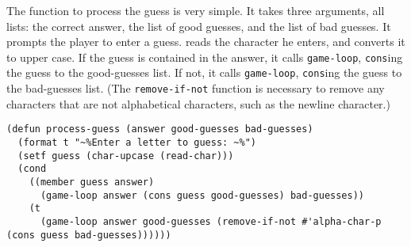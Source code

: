 \documentclass{article}
\begin{document}
The function to process the guess is very simple. It takes three arguments, all lists: the correct answer, the list of good guesses, and the list of bad guesses. It prompts the player to enter a guess. reads the character he enters, and converts it to upper case. If the guess is contained in the answer, it calls \texttt{game-loop}, \texttt{cons}ing the guess to the good-guesses list. If not, it calls \texttt{game-loop}, \texttt{cons}ing the guess to the bad-guesses list. (The \texttt{remove-if-not} function is necessary to remove any characters that are not alphabetical characters, such as the newline character.)

\begin{lstlisting}
(defun process-guess (answer good-guesses bad-guesses)
  (format t "~%Enter a letter to guess: ~%")
  (setf guess (char-upcase (read-char)))
  (cond
    ((member guess answer)  
      (game-loop answer (cons guess good-guesses) bad-guesses))
    (t  
      (game-loop answer good-guesses (remove-if-not #'alpha-char-p (cons guess bad-guesses))))))
\end{lstlisting}
\end{document}
